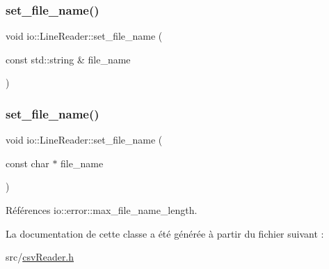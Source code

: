 \subsubsection{\texorpdfstring{set\+\_\+file\+\_\+name()}{set\_file\_name()}\hspace{0.1cm}{\footnotesize\ttfamily [1/2]}}
{\footnotesize\ttfamily void io\+::\+Line\+Reader\+::set\+\_\+file\+\_\+name (\begin{DoxyParamCaption}\item[{const std\+::string \&}]{file\+\_\+name }\end{DoxyParamCaption})\hspace{0.3cm}{\ttfamily [inline]}}

\mbox{\label{classio_1_1LineReader_a81c56ac68497da5ec874333ce063fd83}} 
\subsubsection{\texorpdfstring{set\+\_\+file\+\_\+name()}{set\_file\_name()}\hspace{0.1cm}{\footnotesize\ttfamily [2/2]}}
{\footnotesize\ttfamily void io\+::\+Line\+Reader\+::set\+\_\+file\+\_\+name (\begin{DoxyParamCaption}\item[{const char $\ast$}]{file\+\_\+name }\end{DoxyParamCaption})\hspace{0.3cm}{\ttfamily [inline]}}



Références io\+::error\+::max\+\_\+file\+\_\+name\+\_\+length.



La documentation de cette classe a été générée à partir du fichier suivant \+:\begin{DoxyCompactItemize}
\item 
src/\hyperlink{csvReader_8h}{csv\+Reader.\+h}\end{DoxyCompactItemize}
